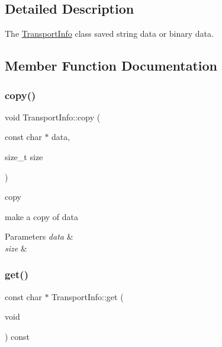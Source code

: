 \subsection{Detailed Description}
The \hyperlink{classAlexaEvent_1_1TransportInfo}{Transport\+Info} class saved string data or binary data. 

\subsection{Member Function Documentation}
\mbox{\label{classAlexaEvent_1_1TransportInfo_a7aa5090ef3266cd45141f7ecc75d853c}} 
\subsubsection{\texorpdfstring{copy()}{copy()}}
{\footnotesize\ttfamily void Transport\+Info\+::copy (\begin{DoxyParamCaption}\item[{const char $\ast$}]{data,  }\item[{size\+\_\+t}]{size }\end{DoxyParamCaption})}



copy 

make a copy of data 
\begin{DoxyParams}{Parameters}
{\em data} & \\
\hline
{\em size} & \\
\hline
\end{DoxyParams}
\mbox{\label{classAlexaEvent_1_1TransportInfo_a204373f734eb372a1cb46f194a890baf}} 
\subsubsection{\texorpdfstring{get()}{get()}}
{\footnotesize\ttfamily const char $\ast$ Transport\+Info\+::get (\begin{DoxyParamCaption}\item[{void}]{ }\end{DoxyParamCaption}) const}



